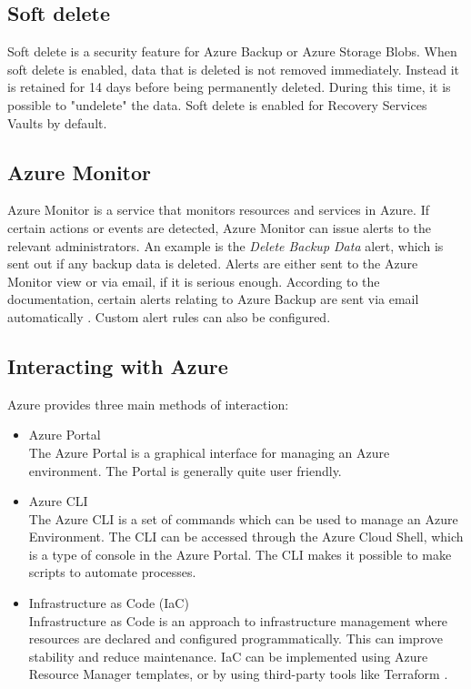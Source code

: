 \subsection{Soft delete} \label{Soft Delete}

Soft delete is a security feature for Azure Backup or Azure Storage Blobs.
When soft delete is enabled, data that is deleted is not removed immediately. 
Instead it is retained for 14 days before being permanently deleted. 
During this time, it is possible to "undelete" the data.
Soft delete is enabled for Recovery Services Vaults by default.

\subsection{Azure Monitor}

Azure Monitor is a service that monitors resources and services in Azure.
If certain actions or events are detected, Azure Monitor can issue alerts to the relevant administrators.
An example is the \textit{Delete Backup Data} alert, which is sent out if any backup data is deleted.
Alerts are either sent to the Azure Monitor view or via email, if it is serious enough.
According to the documentation, certain alerts relating to Azure Backup are sent via email automatically
\cite{v-amallick_monitoring_nodate}.
Custom alert rules can also be configured.


\subsection{Interacting with Azure} 

Azure provides three main methods of interaction:
\begin{itemize}
    \item Azure Portal\\
    The Azure Portal is a graphical interface for managing an Azure environment.
    The Portal is generally quite user friendly.
    \item Azure CLI\\
    The Azure CLI is a set of commands which can be used to manage an Azure Environment.
    The CLI can be accessed through the Azure Cloud Shell, which is a type of console in the Azure Portal.
    The CLI makes it possible to make scripts to automate processes.
    \item Infrastructure as Code (IaC)\\
    Infrastructure as Code is an approach to infrastructure management where resources are
    declared and configured programmatically.
    This can improve stability and reduce maintenance.
    IaC can be implemented using Azure Resource Manager templates,
    or by using third-party tools like Terraform \cite{nishanil_infrastructure_nodate}. 
\end{itemize}

